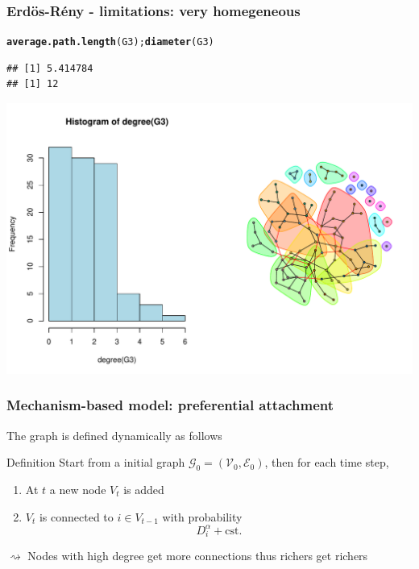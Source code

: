 \documentclass{beamer}\usepackage[]{graphicx}\usepackage[]{color}
\makeatletter
\newcommand{\hlstd}[1]{\textcolor[rgb]{0.345,0.345,0.345}{#1}}%
\newcommand{\hlkwd}[1]{\textcolor[rgb]{0.737,0.353,0.396}{\textbf{#1}}}%
\newenvironment{kframe}{%
 \def\at@end@of@kframe{}%
 \ifinner\ifhmode%
  \def\at@end@of@kframe{\end{minipage}}%
  \begin{minipage}{\columnwidth}%
 \fi\fi%
 \def\FrameCommand##1{\hskip\@totalleftmargin \hskip-\fboxsep
 \colorbox{shadecolor}{##1}\hskip-\fboxsep
     \hskip-\linewidth \hskip-\@totalleftmargin \hskip\columnwidth}%
 \MakeFramed {\advance\hsize-\width
   \@totalleftmargin\z@ \linewidth\hsize
   \@setminipage}}%
 {\par\unskip\endMakeFramed%
 \at@end@of@kframe}
\newenvironment{knitrout}{}{} %
\makeatother
\begin{document}
\begin{frame}[fragile]
  \frametitle{Erdös-Rény - limitations: very homegeneous}

\begin{knitrout}\scriptsize
{}\color{fgcolor}\begin{kframe}
\begin{alltt}
\hlkwd{average.path.length}\hlstd{(G3);} \hlkwd{diameter}\hlstd{(G3)}
\end{alltt}
\begin{verbatim}
## [1] 5.414784
## [1] 12
\end{verbatim}
\end{kframe}
\end{knitrout}

\begin{knitrout}\scriptsize
{}\color{fgcolor}
\includegraphics[width=.8\textwidth]{figures/ER_limitation2-1} 

\end{knitrout}
\end{frame}

\begin{frame}
  \frametitle{Mechanism-based model: preferential attachment}

  The graph is defined dynamically as follows
  \begin{block}{Definition}
    Start from a initial graph $\mathcal{G}_0 = (\mathcal{V}_0,\mathcal{E}_0)$, then for each time step,
    \begin{enumerate}
      \item At $t$ a new node $V_t$ is added
      \item $V_t$ is connected to $i \in V_{t-1}$ with probability
      \begin{equation*}
        D_i^\alpha + \mathrm{cst.}
      \end{equation*}
    \end{enumerate}
  \end{block}
  $\rightsquigarrow$ Nodes with high degree get more connections thus \alert{richers get richers}
\end{frame}
\end{document}
